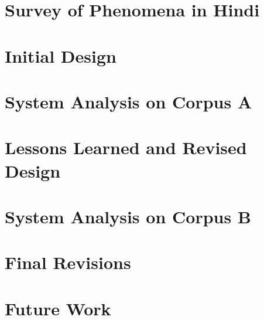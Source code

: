 \documentclass[11pt,letterpaper]{article}
\begin{document}
\section{Survey of Phenomena in Hindi}

\section{Initial Design}

\section{System Analysis on Corpus A}

\section{Lessons Learned and Revised Design}

\section{System Analysis on Corpus B}

\section{Final Revisions}

\section{Future Work}







\label{lastpage}
\end{document}

